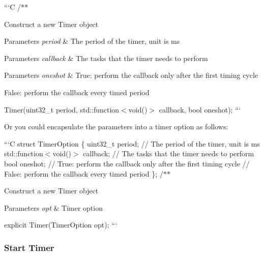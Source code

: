 {\ttfamily  ```\-C /$\ast$$\ast$
\begin{DoxyItemize}
\item Construct a new Timer object
\item 
\item 
\begin{DoxyParams}{Parameters}
{\em period} & The period of the timer, unit is ms\\
\hline
\end{DoxyParams}

\item 
\begin{DoxyParams}{Parameters}
{\em callback} & The tasks that the timer needs to perform\\
\hline
\end{DoxyParams}

\item 
\begin{DoxyParams}{Parameters}
{\em oneshot} & True\-: perform the callback only after the first timing cycle\\
\hline
\end{DoxyParams}

\item False\-: perform the callback every timed period
\end{DoxyItemize}}

{\ttfamily  Timer(uint32\-\_\-t period, std\-::function$<$void()$>$ callback, bool oneshot); ```}

{\ttfamily Or you could encapsulate the parameters into a timer option as follows\-:}

{\ttfamily ```\-C struct Timer\-Option \{ uint32\-\_\-t period; // The period of the timer, unit is ms std\-::function$<$void()$>$ callback; // The tasks that the timer needs to perform bool oneshot; // True\-: perform the callback only after the first timing cycle // False\-: perform the callback every timed period \}; /$\ast$$\ast$
\begin{DoxyItemize}
\item Construct a new Timer object
\item 
\item 
\begin{DoxyParams}{Parameters}
{\em opt} & Timer option\\
\hline
\end{DoxyParams}
explicit Timer(\-Timer\-Option opt); ```
\end{DoxyItemize}}

{\ttfamily \subsubsection*{Start Timer}}

